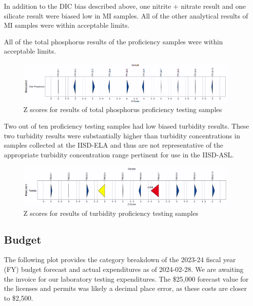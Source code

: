 \documentclass[
]{article}
\begin{document}
In addition to the DIC bias described above, one nitrite + nitrate
result and one silicate result were biased low in MI samples. All of the
other analytical results of MI samples were within acceptable limits.

All of the total phosphorus results of the proficiency samples were
within acceptable limits.

\begin{figure}[h]
\centering
  \includegraphics[width=0.99\textwidth]{2023_PT_TP_zscores.png}
  \caption{Z scores for results of total phosphorus proficiency testing samples}
\end{figure}

Two out of ten proficiency testing samples had low biased turbidity
results. These two turbidity results were substantially higher than
turbidity concentrations in samples collected at the IISD-ELA and thus
are not representative of the appropriate turbidity concentration range
pertinent for use in the IISD-ASL.

\begin{figure}[h]
\centering
  \includegraphics[width=0.99\textwidth]{2023_PT_TU_zscores.png}
  \caption{Z scores for results of turbidity proficiency testing samples}
\end{figure}
\pagebreak

\hypertarget{budget}{%
\subsection{Budget}\label{budget}}

The following plot provides the category breakdown of the 2023-24 fiscal
year (FY) budget forecast and actual expenditures as of 2024-02-28. We
are awaiting the invoice for our laboratory testing expenditures. The
\$25,000 forecast value for the licenses and permits was likely a
decimal place error, as these costs are closer to \$2,500.
\end{document}
